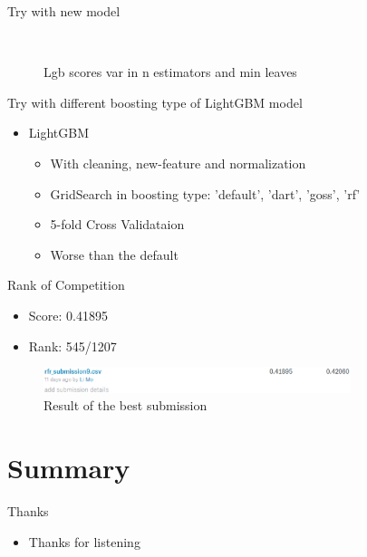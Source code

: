 \documentclass[
 size=12pt,
 paper=smartboard, %
 mode=present, %
 display=slides, %
style=tuliplab,
pauseslide,
fleqn,leqno]{powerdot}
\begin{document}
\begin{slide}{Try with new model}
\begin{itemize}
\begin{itemize}
\begin{figure}[h]
\begin{minipage}[t]{0.4\linewidth}
          \caption{Lgb scores var in n estimators and min leaves}
          \label{fig:lgb-n-leaves}
        \end{minipage} 
      \end{figure}
    \end{itemize}
  \end{itemize}
\end{slide}

\begin{slide}{Try with different boosting type of LightGBM model}
  \begin{itemize}
    \item LightGBM
    \begin{itemize}
      \item With cleaning, new-feature and normalization
      \item GridSearch in boosting type: 'default', 'dart', 'goss', 'rf'
      \item 5-fold Cross Validataion \pause
      \item Worse than the default
    \end{itemize}
  \end{itemize}
\end{slide}


\begin{slide}{Rank of Competition}
  \begin{itemize}
    \item Score: 0.41895
    \item Rank: 545/1207
  \end{itemize}
  \begin{figure}[h]
    \centering
    \includegraphics[width=0.8\textwidth]{figures2/score.eps}
    \caption{Result of the best submission}
    \label{fig:result-of-best-submission}
  \end{figure} 
\end{slide}


\section{Summary}

\begin{slide}{Thanks}
  \begin{itemize}
    \item Thanks for listening~
  \end{itemize}
\end{slide}
\end{document}
